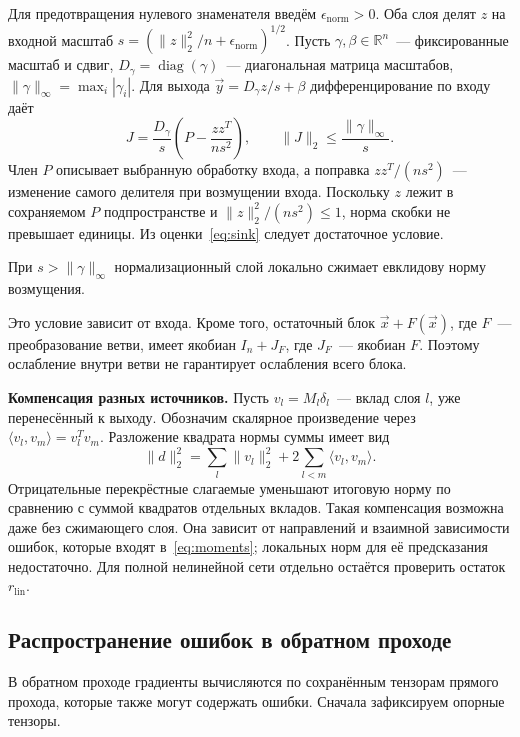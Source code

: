 Для предотвращения нулевого знаменателя введём $\epsilon_{\mathrm{norm}}>0$.
Оба слоя делят $z$ на входной масштаб
$s=(\|z\|_2^2/n+\epsilon_{\mathrm{norm}})^{1/2}$.
Пусть $\gamma,\beta\in\mathbb{R}^{n}$~--- фиксированные масштаб и сдвиг,
$D_\gamma=\operatorname{diag}(\gamma)$~--- диагональная матрица масштабов,
$\|\gamma\|_\infty=\max_i|\gamma_i|$.
Для выхода $\Vec{y}=D_\gamma z/s+\beta$ дифференцирование по входу даёт
\begin{equation}
    \label{eq:sink}
    J=\frac{D_\gamma}{s}
       \left(P-\frac{zz^T}{ns^2}\right),\qquad
    \|J\|_2\le\frac{\|\gamma\|_\infty}{s}.
\end{equation}
Член $P$ описывает выбранную обработку входа, а поправка
$zz^T/(ns^2)$~--- изменение самого делителя при возмущении входа.
Поскольку $z$ лежит в сохраняемом $P$ подпространстве и
$\|z\|_2^2/(ns^2)\le1$, норма скобки не превышает единицы.
Из оценки~\eqref{eq:sink} следует достаточное условие.
\begin{statement}\label{st:sink}
    При $s>\|\gamma\|_\infty$ нормализационный слой локально сжимает
    евклидову норму возмущения.
\end{statement}
Это условие зависит от входа. Кроме того, остаточный блок
$\Vec{x}+F(\Vec{x})$, где $F$~--- преобразование ветви,
имеет якобиан $I_n+J_F$, где $J_F$~--- якобиан $F$.
Поэтому ослабление внутри ветви не гарантирует ослабления всего блока.

\textbf{Компенсация разных источников.}
Пусть $v_l=M_l\delta_l$~--- вклад слоя $l$, уже перенесённый к выходу.
Обозначим скалярное произведение через $\langle v_l,v_m\rangle=v_l^Tv_m$.
Разложение квадрата нормы суммы имеет вид
\[
    \|d\|_2^2
    =\sum_l\|v_l\|_2^2
     +2\sum_{l<m}\langle v_l,v_m\rangle.
\]
Отрицательные перекрёстные слагаемые уменьшают итоговую норму
по сравнению с суммой квадратов отдельных вкладов.
Такая компенсация возможна даже без сжимающего слоя.
Она зависит от направлений и взаимной зависимости ошибок,
которые входят в~\eqref{eq:moments}; локальных норм для её предсказания
недостаточно. Для полной нелинейной сети отдельно остаётся проверить
остаток $r_{\mathrm{lin}}$.

\subsection{Распространение ошибок в обратном проходе}

В обратном проходе градиенты вычисляются по сохранённым тензорам
прямого прохода, которые также могут содержать ошибки.
Сначала зафиксируем опорные тензоры.

